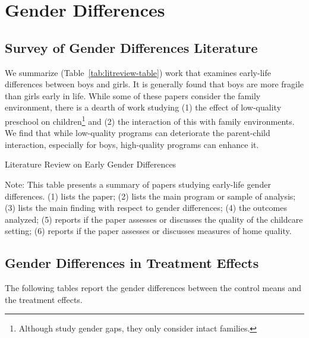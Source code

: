 \section{Gender Differences}
\label{appendix:genderdifferences}

\subsection{Survey of Gender Differences Literature}
\label{appendix:gdiff-survey}

We summarize (Table~\ref{tab:litreview-table}) work that examines early-life differences between boys and girls. It is generally found that boys are more fragile than girls early in life. While some of these papers consider the family environment, there is a dearth of work studying (1) the effect of low-quality preschool on children\footnote{Although \citet{Kottelenberg-Lehrer_2014_Gender-Effects} study gender gaps, they only consider intact families.} and (2) the interaction of this with family environments. We find that while low-quality programs can deteriorate the parent-child interaction, especially for boys, high-quality programs can enhance it.

\begin{table}
\centering
\caption{Literature Review on Early Gender Differences}
\label{tab:litreview-table}
\begin{adjustbox}{width=1.05\textwidth}
\begin{threeparttable}

\begin{tablenotes}
\Large
\item Note: This table presents a summary of papers studying early-life gender differences. (1) lists the paper; (2) lists the main program or sample of analysis; (3) lists the main finding with respect to gender differences; (4) the outcomes analyzed; (5) reports if the paper assesses or discusses the quality of the childcare setting; (6) reports if the paper assesses or discusses measures of home quality.
\end{tablenotes}
\end{threeparttable}
\end{adjustbox}
\end{table} 

\subsection{Gender Differences in Treatment Effects}
\label{appendix:gdiff-tes}
The following tables report the gender differences between the control means and the treatment effects.

